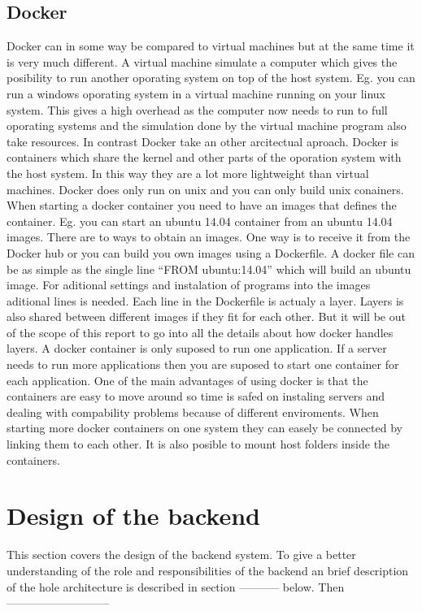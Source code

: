 \documentclass[a4paper,12pt,english]{article}
\begin{document}
\subsection{Docker}
Docker can in some way be compared to virtual machines but at the same time it
is very much different. A virtual machine simulate a computer which gives the
posibility to run another oporating system on top of the host system. Eg. you
can run a windows oporating system in a virtual machine running on your linux
system. This gives a high overhead as the computer now needs to run to full
oporating systems and the simulation done by the virtual machine program also
take resources. In contrast Docker take an other arcitectual aproach. Docker
is containers which share the kernel and other parts of the oporation system
with the host system. In this way they are a lot more lightweight than virtual
machines. Docker does only run on unix and you can only build unix conainers.
When starting a docker container you need to have an images that defines
the container. Eg. you can start an ubuntu 14.04 container from an ubuntu 14.04
images. There are to ways to obtain an images. One way is to receive it from the
Docker hub or you can build you own images using a Dockerfile. A docker file can
be as simple as the single line ``FROM ubuntu:14.04'' which will build an
ubuntu image. For aditional settings and instalation of programs into the images
aditional lines is needed. Each line in the Dockerfile is actualy a layer.
Layers is also shared between different images if they fit for each other. But it will be out
of the scope of this report to go into all the details about how docker
handles layers. A docker container is only suposed to run one application. If
a server needs to run more applications then you are suposed to start one
container for each application. One of the main advantages of using docker is
that the containers are easy to move around so time is safed on instaling servers and
dealing with compability problems because of different enviroments.
When starting more docker containers on one system they can easely be connected
by linking them to each other. It is also posible to mount host folders inside
the containers.
\clearpage

\section{Design of the backend}
This section covers the design of the backend system. To give a better
understanding of the role and responsibilities of the backend an brief
description of the hole architecture is described in section -----------
below. Then ---------------------------
\end{document}
